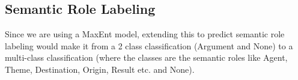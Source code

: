 \subsection{Semantic Role Labeling}
 Since we are using a MaxEnt model, extending this to predict semantic role labeling would make it from a 2 class classification (Argument and None) to a multi-class classification (where the classes are the semantic roles like Agent, Theme, Destination, Origin, Result etc. and None). 